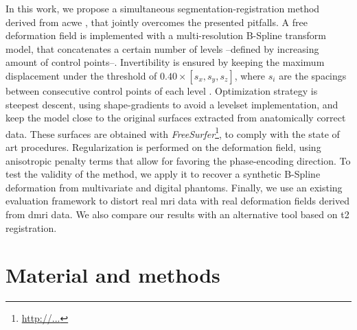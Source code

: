 \documentclass{llncs}
\begin{document}
In this work, we propose a simultaneous segmentation-registration
  method derived from \gls*{acwe} \cite{chan_active_2001}, that
  jointly overcomes the presented pitfalls.
A free deformation field is implemented with a multi-resolution 
  B-Spline transform model, that concatenates a certain number of 
  levels --defined by increasing amount of control points--.
Invertibility is ensured by keeping the maximum displacement under
  the threshold of $0.40 \times [ s_x, s_y, s_z ]$, where $s_i$ are
  the spacings between consecutive control points of each level
  \cite{rueckert_diffeomorphic_2006}.
Optimization strategy is steepest descent, using shape-gradients
  \cite{jehan-besson_dream2s:_2003} to avoid a levelset implementation,
  and keep the model close to the original surfaces extracted from
  anatomically correct data.
These surfaces are obtained with \emph{FreeSurfer}\footnote{\url{http://...}},
  to comply with the state of art procedures.
Regularization is performed on the deformation field, using anisotropic
  penalty terms that allow for favoring the phase-encoding direction.
To test the validity of the method, we apply it to recover
  a synthetic B-Spline deformation from multivariate and digital
  phantoms.
Finally, we use an existing evaluation framework \cite{esteban_phantom_2014}
  to distort real \gls*{mri} data with real deformation fields derived
  from \gls*{dmri} data.
We also compare our results with an alternative tool based on \gls*{t2}
  registration.
  
\section{Material and methods}\label{sec:methods}




\end{document}
